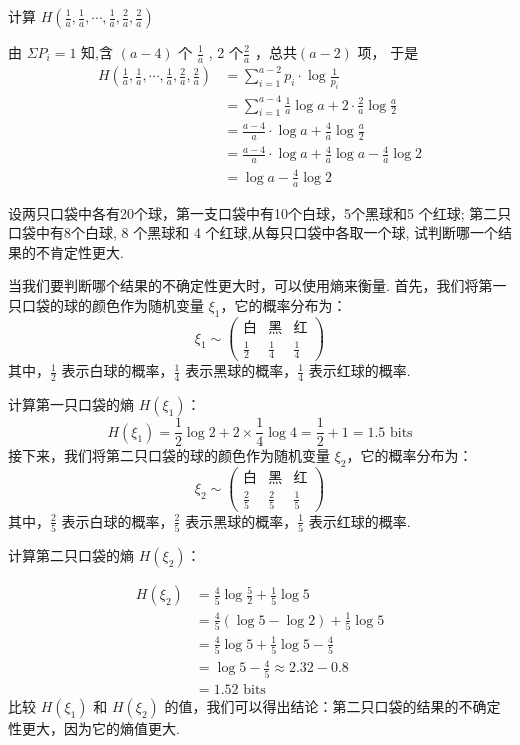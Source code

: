 \begin{tcolorbox}[breakable,colback=blue!5!white,colframe=blue!75!black,
 title=计算题]
计算 $ H\left(\frac{1}{a}, \frac{1}{a}, \cdots, \frac{1}{a}, \frac{2}{a}, \frac{2}{a}\right) $


 \tcblower
由 $ \Sigma P_{i}=1 $ 知,含 $ (a-4) $ 个 $ \frac{1}{a}$ , 2 个$ \frac{2}{a} $ ，总共$ (a-2) $ 项， 于是
$$
\begin{aligned}
H\left(\frac{1}{a}, \frac{1}{a}, \cdots, \frac{1}{a}, \frac{2}{a}, \frac{2}{a}\right) & =\sum_{i=1}^{a-2} p_{i} \cdot \log \frac{1}{p_{i}} \\
& =\sum_{i=1}^{a-4} \frac{1}{a} \log a+2 \cdot \frac{2}{a} \log \frac{a}{2} \\
& =\frac{a-4}{a} \cdot \log a+\frac{4}{a} \log \frac{a}{2} \\
& =\frac{a-4}{a} \cdot \log a+\frac{4}{a} \log a-\frac{4}{a} \log 2 \\
& =\log a-\frac{4}{a} \log 2
\end{aligned}
$$
\end{tcolorbox}


\begin{tcolorbox}[breakable,colback=blue!5!white,colframe=blue!75!black,
 title=计算题]
设两只口袋中各有20个球，第一支口袋中有10个白球，5个黑球和5 个红球; 第二只口袋中有8个白球, 8 个黑球和 4 个红球,从每只口袋中各取一个球, 试判断哪一个结果的不肯定性更大.


 \tcblower
当我们要判断哪个结果的不确定性更大时，可以使用熵来衡量.
首先，我们将第一只口袋的球的颜色作为随机变量 $\xi_1$，它的概率分布为：
$$
\xi_1 \sim \left(\begin{array}{ccc}\text{白} & \text{黑} & \text{红} \\ \frac{1}{2} & \frac{1}{4} & \frac{1}{4}\end{array}\right)
$$
其中，$\frac{1}{2}$ 表示白球的概率，$\frac{1}{4}$ 表示黑球的概率，$\frac{1}{4}$ 表示红球的概率.

计算第一只口袋的熵 $H(\xi_1)$：
$$ H\left(\xi_{1}\right)=\frac{1}{2} \log 2+2 \times \frac{1}{4} \log 4=\frac{1}{2}+1=1.5  \text{ bits}
$$
接下来，我们将第二只口袋的球的颜色作为随机变量 $\xi_2$，它的概率分布为：
$$
\xi_2 \sim \left(\begin{array}{ccc}\text{白} & \text{黑} & \text{红} \\ \frac{2}{5} & \frac{2}{5} & \frac{1}{5}\end{array}\right)
$$
其中，$\frac{2}{5}$ 表示白球的概率，$\frac{2}{5}$ 表示黑球的概率，$\frac{1}{5}$ 表示红球的概率.

计算第二只口袋的熵 $H(\xi_2)$：

$$
\begin{aligned}
H\left(\xi_{2}\right) & =\frac{4}{5} \log \frac{5}{2}+\frac{1}{5} \log 5 \\
& =\frac{4}{5}(\log 5-\log 2)+\frac{1}{5} \log 5 \\
& =\frac{4}{5} \log 5+\frac{1}{5} \log 5-\frac{4}{5} \\
& =\log 5-\frac{4}{5} \approx 2.32-0.8 \\
& =1.52 \text { bits }
\end{aligned}
$$
比较 $H(\xi_1)$ 和 $H(\xi_2)$ 的值，我们可以得出结论：第二只口袋的结果的不确定性更大，因为它的熵值更大. 
\end{tcolorbox}